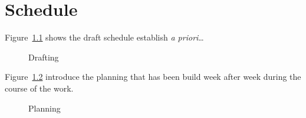 \documentclass[11pt, english, screen]{report-rd-info}
\begin{document}


\chapter{Schedule}


Figure~\ref{fig:Drafting} shows the draft schedule establish \emph{a priori}\ldots

\begin{figure}
   \centering
   \caption{Drafting}
   \label{fig:Drafting}
\end{figure}

Figure~\ref{fig:Planning} introduce the planning that has been build week after week during the course of the work.

\begin{figure}
   \centering
   \caption{Planning}
   \label{fig:Planning}
\end{figure}
\end{document}
